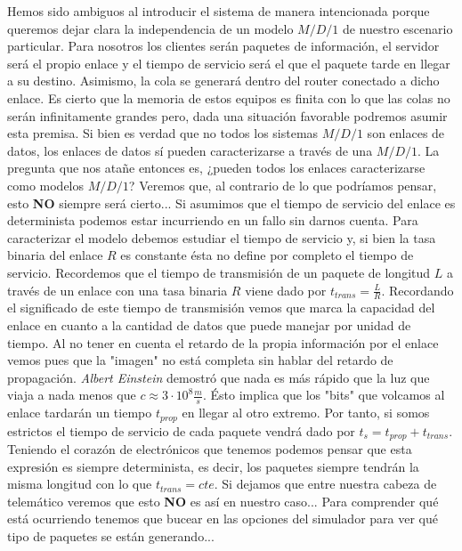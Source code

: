 \documentclass{article}[10pt]
\begin{document}
		Hemos sido ambiguos al introducir el sistema de manera intencionada porque queremos dejar clara la independencia de un modelo $M/D/1$ de nuestro escenario particular. Para nosotros los clientes serán paquetes de información, el servidor será el propio enlace y el tiempo de servicio será el que el paquete tarde en llegar a su destino. Asimismo, la cola se generará dentro del router conectado a dicho enlace. Es cierto que la memoria de estos equipos es finita con lo que las colas no serán infinitamente grandes pero, dada una situación favorable podremos asumir esta premisa. Si bien es verdad que no todos los sistemas $M/D/1$ son enlaces de datos, los enlaces de datos sí pueden caracterizarse a través de una $M/D/1$. La pregunta que nos atañe entonces es, ¿pueden todos los enlaces caracterizarse como modelos $M/D/1$? Veremos que, al contrario de lo que podríamos pensar, esto \textbf{NO} siempre será cierto... Si asumimos que el tiempo de servicio del enlace es determinista podemos estar incurriendo en un fallo sin darnos cuenta. Para caracterizar el modelo debemos estudiar el tiempo de servicio y, si bien la tasa binaria del enlace $R$ es constante ésta no define por completo el tiempo de servicio. Recordemos que el tiempo de transmisión de un paquete de longitud $L$ a través de un enlace con una tasa binaria $R$ viene dado por $t_{trans} = \frac{L}{R}$. Recordando el significado de este tiempo de transmisión vemos que marca la capacidad del enlace en cuanto a la cantidad de datos que puede manejar por unidad de tiempo. Al no tener en cuenta el retardo de la propia información por el enlace vemos pues que la "imagen" no está completa sin hablar del retardo de propagación. \textit{Albert Einstein} demostró que nada es más rápido que la luz que viaja a nada menos que $c \approx 3 \cdot 10^8 \frac{m}{s}$. Ésto implica que los "bits" que volcamos al enlace tardarán un tiempo $t_{prop}$ en llegar al otro extremo. Por tanto, si somos estrictos el tiempo de servicio de cada paquete vendrá dado por $t_{s} = t_{prop} + t_{trans}$. Teniendo el corazón de electrónicos que tenemos podemos pensar que esta expresión es siempre determinista, es decir, los paquetes siempre tendrán la misma longitud con lo que $t_{trans} = cte$. Si dejamos que entre nuestra cabeza de telemático veremos que esto \textbf{NO} es así en nuestro caso... Para comprender qué está ocurriendo tenemos que bucear en las opciones del simulador para ver qué tipo de paquetes se están generando...\\
\end{document}
